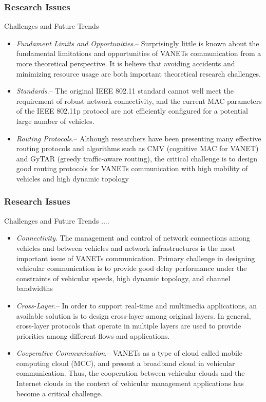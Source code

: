 \documentclass{beamer}
\begin{document}
\begin{frame}
	\frametitle{Research Issues}
	\begin{block}{Challenges and Future Trends}
		\begin{itemize}
			\item \textit{Fundament Limits and Opportunities}.-- 
			Surprisingly little is known about the fundamental limitations and opportunities of VANETs communication from a more theoretical perspective. It is believe that avoiding accidents and minimizing resource usage are both important theoretical research challenges.
			\item \textit{Standards}.-- 
			The original IEEE 802.11 standard cannot well meet the requirement of robust network connectivity, and the current MAC parameters of the IEEE 802.11p protocol are not efficiently configured for a potential large number of vehicles.
			\item \textit{Routing Protocols}.--
			Although researchers have been presenting many effective routing protocols and algorithms such as CMV (cognitive MAC for VANET) and GyTAR (greedy traffic-aware routing), the critical challenge is to design good routing protocols for VANETs communication with high mobility of vehicles and high dynamic topology 
			
		
			
			
			
		\end{itemize}
	\end{block}
	
\end{frame}
\begin{frame}
	\frametitle{Research Issues}
	\begin{block}{Challenges and Future Trends ....}
		\begin{itemize}
			\item \textit{Connectivity}. 
			The management and control of network connections among vehicles and between vehicles and network infrastructures is the most important issue of VANETs communication. 
			Primary challenge in designing vehicular communication is to provide good delay performance under the constraints of vehicular speeds, high dynamic topology, and channel bandwidths
			\item \textit{Cross-Layer}.-- 
			In order to support real-time and multimedia applications, an available solution is to design cross-layer among original layers. In general, cross-layer protocols that operate in multiple layers are used to provide priorities among different flows and applications.
			
			\item \textit{Cooperative Communication}.-- 
			VANETs as a type of cloud called mobile computing cloud (MCC), and present a broadband cloud in vehicular communication.
			Thus, the cooperation between vehicular clouds and the Internet clouds in the context of vehicular management applications has become a critical challenge.
			
				
		
			
			
		\end{itemize}
	\end{block}
\end{frame}
\end{document}
